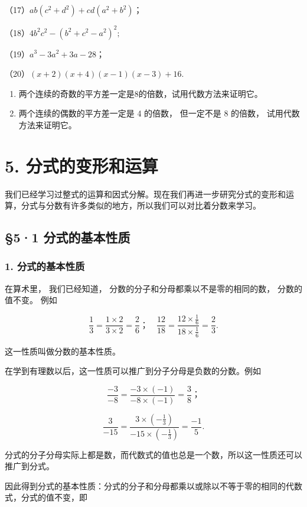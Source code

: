 （17）\(ab(c^2 + d^2) + cd(a^2 + b^2)\)；

（18）\(4b^{2}c^{2} - (b^{2} + c^{2} - a^{2})^{2};\)

（19）\(a^3 - 3a^2 + 3a - 28\)；

（20）\((x + 2)(x + 4)(x - 1)(x - 3) + 16.\)

\begin{enumerate}[start=2]
\item
  两个连续的奇数的平方差一定是8的倍数，试用代数方法来证明它。
\item
  两个连续的偶数的平方差一定是 4 的倍数， 但一定不是 8 的倍数，
  试用代数方法来证明它。
\end{enumerate}

\chapter{5. 分式的变形和运算}

我们已经学习过整式的运算和因式分解。现在我们再进一步研究分式的变形和运算，分式与分数有许多类似的地方，所以我们可以对比着分数来学习。

\section{§5·1 分式的基本性质}

\subsection{1. 分式的基本性质}

在算术里， 我们已经知道， 分数的分子和分母都乘以不是零的相同的数，
分数的值不变。 例如

\[
\frac{1}{3} = \frac{1 \times 2}{3 \times 2} = \frac{2}{6}\text{；} \quad \frac{12}{18} = \frac{12 \times \frac{1}{6}}{18 \times \frac{1}{6}} = \frac{2}{3}.
\]

这一性质叫做分数的基本性质。

在学到有理数以后，这一性质可以推广到分子分母是负数的分数。例如

\[
\frac{- 3}{- 8} = \frac{- 3 \times (- 1)}{- 8 \times (- 1)} = \frac{3}{8}\text{；}
\]

\[
\frac{3}{- 15} = \frac{3 \times \left(- \frac{1}{3}\right)}{- 15 \times \left(- \frac{1}{3}\right)} = \frac{- 1}{5}.
\]

分式的分子分母实际上都是数，而代数式的值也总是一个数，所以这一性质还可以推广到分式。

因此得到分式的基本性质：分式的分子和分母都乘以或除以不等于零的相同的代数式，分式的值不变，即

